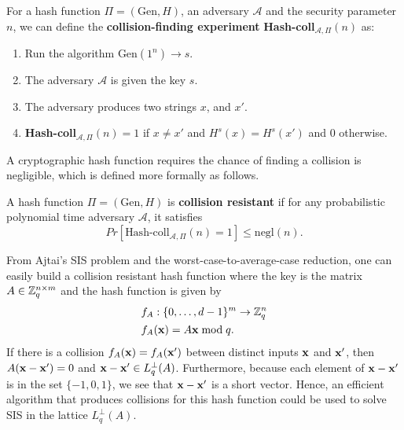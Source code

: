 \documentclass[../main.tex]{subfiles}
\begin{document}
For a hash function $\Pi=(\text{Gen},H)$, an adversary $\mathcal{A}$ and the security parameter $n$, we can define the \textbf{collision-finding experiment} \textbf{Hash-coll}$_{\mathcal{A},\Pi}(n)$ as:
\reversemarginpar
{}
\begin{enumerate}
    \item Run the algorithm $\text{Gen}(1^n) \rightarrow s$. 
    \item The adversary $\mathcal{A}$ is given the key $s$.
    \item The adversary produces two strings $x$, and $x'$.
    \item \textbf{Hash-coll}$_{\mathcal{A},\Pi}(n)=1$ if $x \neq x'$ and $H^s(x)=H^s(x')$ and 0 otherwise.  
\end{enumerate}

A cryptographic hash function requires the chance of finding a collision is negligible, which is defined more formally as follows. 
\begin{definition}
A hash function $\Pi=(\text{Gen},H)$ is \textbf{collision resistant} 
\reversemarginpar
{}
if for any probabilistic polynomial time adversary $\mathcal{A}$, it satisfies 
\begin{equation*}
    Pr[\text{Hash-coll}_{\mathcal{A},\Pi}(n)=1] \le \text{negl}(n).
\end{equation*}
\end{definition}

From Ajtai's SIS problem and the worst-case-to-average-case reduction, one can easily build a collision resistant hash function where the key is the matrix $A \in \mathbb{Z}_q^{n \times m}$ and the hash function is given by 
\begin{align*}
    &f_A: \{0, \dots, d-1\}^m \rightarrow \mathbb{Z}_q^n \\
    &f_A(\mathbf{x})=A\mathbf{x} \bmod q.
\end{align*}
If there is a collision $f_A(\mathbf{x})=f_A(\mathbf{x'})$ between distinct inputs $\mathbf{x}$ and $\mathbf{x'}$, then $A(\mathbf{x}-\mathbf{x}^{\prime}) = 0$ and $\mathbf{x} - \mathbf{x}^{\prime} \in L^{\perp}_q(A)$. Furthermore, because each element of $\mathbf{x} - \mathbf{x}^{\prime}$ is in the set $\{-1,0,1\}$, we see that $\mathbf{x} - \mathbf{x}^{\prime}$ is a short vector. Hence, an efficient algorithm that produces collisions for this hash function could be used to solve SIS in the lattice $L^{\perp}_q(A)$. 

\end{document}
